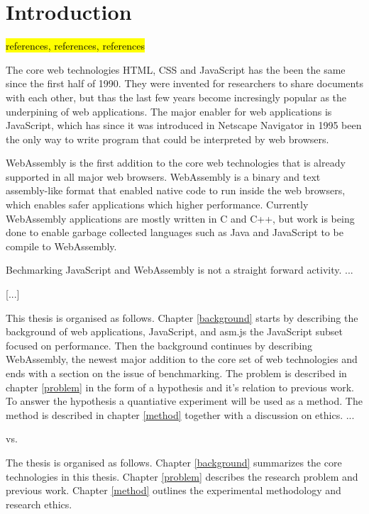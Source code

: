\section{Introduction}

\hl{references, references, references}

The core web technologies HTML, CSS and JavaScript has the been the same since the first half of 1990. They were invented for researchers to share documents with each other, but thas the last few years become incresingly popular as the underpining of web applications. The major enabler for web applications is JavaScript, which has since it was introduced in Netscape Navigator in 1995 been the only way to write program that could be interpreted by web browsers.

WebAssembly is the first addition to the core web technologies that is already supported in all major web browsers. WebAssembly is a binary and text assembly-like format that enabled native code to run inside the web browsers, which enables safer applications which higher performance. Currently WebAssembly applications are mostly written in C and C++, but work is being done to enable garbage collected languages such as Java and JavaScript to be compile to WebAssembly.

Bechmarking JavaScript and WebAssembly is not a straight forward activity. ...

[...]

This thesis is organised as follows. Chapter \ref{background} starts by describing the background of web applications, JavaScript, and asm.js the JavaScript subset focused on performance. Then the background continues by describing WebAssembly, the newest major addition to the core set of web technologies and ends with a section on the issue of benchmarking. The problem is described in chapter \ref{problem} in the form of a hypothesis and it's relation to previous work. To answer the hypothesis a quantiative experiment will be used as a method. The method is described in chapter \ref{method} together with a discussion on ethics. ...

vs.

The thesis is organised as follows. Chapter \ref{background} summarizes the core technologies in this thesis. Chapter \ref{problem} describes the research problem and previous work. Chapter \ref{method} outlines the experimental methodology and research ethics. 
